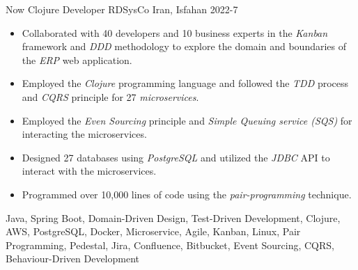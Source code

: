 
\begin{experiences}
\experience
{Now}
{Clojure Developer}
{RDSysCo}
{Iran, Isfahan}
{2022-7}
{
\begin{itemize}
\item Collaborated with 40 developers and 10 business experts in the \emph{Kanban} framework and \emph{DDD} methodology to explore the domain and boundaries of the \textit{ERP} web application.
\item Employed the \emph{Clojure} programming language and followed the \emph{TDD} process and \textit{CQRS} principle for 27 \emph{microservices}.
\item Employed the \textit{Even Sourcing} principle and \textit{Simple Queuing service (SQS)} for interacting the microservices.
\item Designed 27 databases using \emph{PostgreSQL} and utilized the \emph{JDBC} API to interact with the microservices.
\item Programmed over 10,000 lines of code using the \emph{pair-programming} technique.
\end{itemize}
}
{Java, Spring Boot, Domain-Driven Design, Test-Driven Development, Clojure, AWS, PostgreSQL, Docker, Microservice, Agile, Kanban, Linux, Pair Programming, Pedestal, Jira, Confluence, Bitbucket, Event Sourcing, CQRS, Behaviour-Driven Development}

\emptySeparator


\end{experiences}
